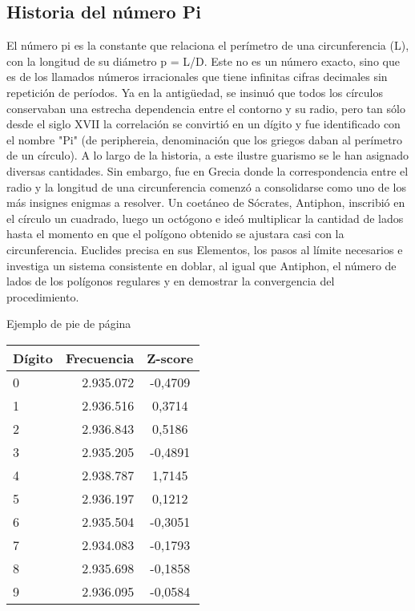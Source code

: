\documentclass[spanish,a4paper,10pt]{article}
\begin{document}
\subsection{Historia del número Pi}
El número pi es la constante que relaciona el perímetro de una circunferencia (L),
con la longitud de su diámetro p = L/D. Este no es un número exacto, sino que es de los llamados números irracionales
que tiene infinitas cifras decimales sin repetición de períodos. Ya en la antigüedad, se insinuó que todos los círculos
conservaban una estrecha dependencia entre el contorno y su radio, pero tan sólo desde el siglo XVII la correlación se
convirtió en un dígito y fue identificado con el nombre "Pi" (de periphereia, denominación que los griegos daban al
perímetro de un círculo). A lo largo de la historia, a este ilustre guarismo se le han asignado diversas cantidades.
Sin embargo, fue en Grecia donde la correspondencia entre el radio y la longitud de una circunferencia comenzó a consolidarse
como uno de los más insignes enigmas a resolver. Un coetáneo de Sócrates, Antiphon, inscribió en el círculo un cuadrado,
luego un octógono e ideó multiplicar la cantidad de lados hasta el momento en que el polígono obtenido se ajustara casi con
la circunferencia. Euclides precisa en sus Elementos, los pasos al límite necesarios e investiga un sistema consistente en
doblar, al igual que Antiphon, el número de lados de los polígonos regulares y en demostrar la convergencia del procedimiento. 

\begin{footnotesize}
 Ejemplo de pie de página
\end{footnotesize}
\begin{tabular}{lrc}
Dígito & Frecuencia & Z-score\\
\hline
0 & 2.935.072 & -0,4709\\
1 & 2.936.516 & 0,3714\\
2 & 2.936.843 & 0,5186\\
3 & 2.935.205 & -0,4891\\
4 & 2.938.787 & 1,7145\\
5 & 2.936.197 & 0,1212\\
6 & 2.935.504 & -0,3051\\
7 & 2.934.083 & -0,1793\\
8 & 2.935.698 & -0,1858\\
9 & 2.936.095 & -0,0584\\
\end{tabular}
\end{document}
